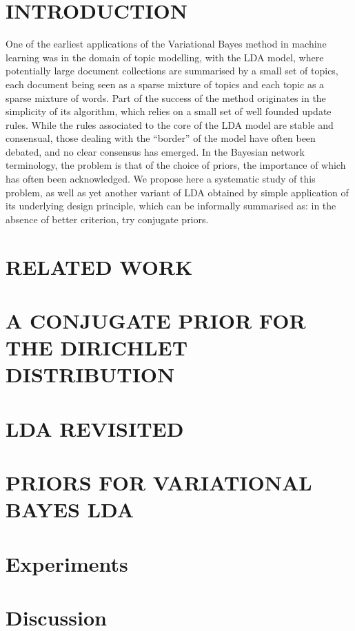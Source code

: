 \documentclass[twoside]{article}
\begin{document}
\section{INTRODUCTION}
One of the earliest applications of the Variational Bayes method in machine learning was in the domain of topic modelling, with the LDA model, where potentially large document collections are summarised by a small set of topics, each document being seen as a sparse mixture of topics and each topic as a sparse mixture of words. Part of the success of the method originates in the simplicity of its algorithm, which relies on a small set of well founded update rules. While the rules associated to the core of the LDA model are stable and consensual, those dealing with the ``border'' of the model have often been debated, and no clear consensus has emerged. In the Bayesian network terminology, the problem is that of the choice of priors, the importance of which has often been acknowledged. We propose here a systematic study of this problem, as well as yet another variant of LDA obtained by simple application of its underlying design principle, which can be informally summarised as: in the absence of better criterion, try conjugate priors.
\section{RELATED WORK}

\section{A CONJUGATE PRIOR FOR THE DIRICHLET DISTRIBUTION}
\label{sec:huntingsnark}

\section{LDA REVISITED}
\label{sec:ldarevisited}

\section{PRIORS FOR VARIATIONAL BAYES LDA}
\label{sec:ldawithcprior}



\section{Experiments}
\section{Discussion}



\pagebreak %



\end{document}
